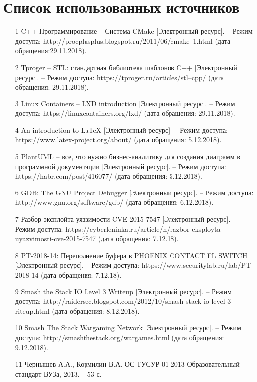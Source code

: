 \section*{Список использованных источников}
\begin{enumerate}
\item[1 ]C++ Программирование -- Система CMake [Электронный ресурс]. -- Режим доступа: http://procplusplus.blogspot.ru/2011/06/cmake–1.html (дата обращения:29.11.2018).
\item[2 ]Tproger -- STL: стандартная библиотека шаблонов C++ [Электронный ресурс]. -- Режим доступа: https://tproger.ru/articles/stl–cpp/ (дата обращения: 29.11.2018).
\item[3 ]Linux Containers -- LXD introduction [Электронный ресурс]. -- Режим доступа: https://linuxcontainers.org/lxd/ (дата обращения: 29.11.2018).
\item[4 ]An introduction to LaTeX [Электронный ресурс]. -- Режим доступа: https://www.latex-project.org/about/ (дата обращения: 5.12.2018).
\item[5 ]PlantUML -- все, что нужно бизнес-аналитику для создания диаграмм в программной документации [Электронный ресурс]. -- Режим доступа: https://habr.com/post/416077/ (дата обращения: 5.12.2018).
\item[6 ]GDB: The GNU Project Debugger [Электронный ресурс]. -- Режим доступа: http://www.gnu.org/software/gdb/ (дата обращения: 6.12.2018).
\item[7 ] Разбор эксплойта уязвимости CVE-2015-7547 [Электронный ресурс]. -- Режим доступа: https://cyberleninka.ru/article/n/razbor-eksployta-uyazvimosti-cve-2015-7547 (дата обращения: 7.12.18).
\item[8 ]PT-2018-14: Переполнение буфера в PHOENIX CONTACT FL SWITCH [Электронный ресурс]. -- Режим доступа: https://www.securitylab.ru/lab/PT-2018-14 (дата обращения: 7.12.18).
\item[9 ] Smash the Stack IO Level 3 Writeup [Электронный ресурс]. -- Режим доступа: http://raidersec.blogspot.com/2012/10/smash-stack-io-level-3-riteup.html (дата обращения: 8.12.2018). 
\item[10 ] Smash The Stack Wargaming Network [Электронный ресурс]. -- Режим доступа: http://smashthestack.org/wargames.html (дата обращения: 9.12.2018).
\item[11 ]Чернышев А.А., Кормилин В.А. ОС ТУСУР 01-2013 Образовательный стандарт ВУЗа, 2013. -- 53 с.
\end{enumerate} 
\clearpage
